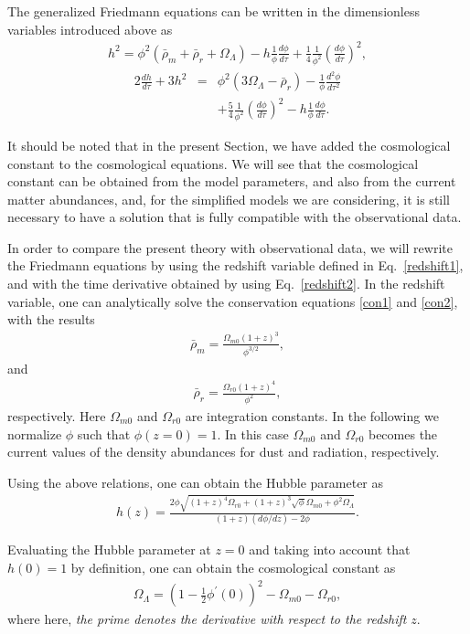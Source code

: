 \documentclass[aps,superscriptaddress, showpacs,preprintnumbers, superscriptaddress, nofootinbibt,twocolumn]{revtex4-2}
\def\bea{\begin{eqnarray}}
\def\eea{\end{eqnarray}}
\begin{document}
The generalized Friedmann  equations can be written in the dimensionless variables introduced above as
\begin{align}
h^2=\phi^2(\bar\rho_m+\bar\rho_r+\Omega_\Lambda)-h\frac{1}{\phi}\frac{d\phi}{d\tau}+\frac{1}{4}\frac{1}{\phi ^2}\left(\frac{d\phi}{d\tau}\right)^2,
\end{align}
\bea
2\frac{dh}{d\tau}+3h^2&=&\phi^2(3\Omega_\Lambda-\bar\rho_r)-\frac{1}{\phi}\frac{d^2\phi}{d\tau ^2}\nonumber\\
&&+\frac54\frac{1}{\phi ^2}\left(\frac{d\phi}{d\tau}\right)^2-h\frac{1}{\phi}\frac{d\phi}{d\tau}.
\eea

It should be noted that in the present Section, we have added the cosmological constant to the cosmological equations. We will see that the cosmological constant can be obtained from the model parameters, and also from the current matter abundances, and, for the simplified models we are considering, it is still necessary to have a solution that is fully compatible with the observational data.

In order to compare the present theory with observational data, we will rewrite the Friedmann equations by using the redshift variable defined in Eq.~\eqref{redshift1}, and with the time derivative obtained by using Eq.~\eqref{redshift2}. In the redshift variable, one can analytically solve the conservation equations \eqref{con1} and \eqref{con2}, with the results
\begin{align}
\bar\rho_m=\frac{\Omega_{m0}(1+z)^3}{\phi^{3/2}},
\end{align}
and
\begin{align}
\bar\rho_r=\frac{\Omega_{r0}(1+z)^4}{\phi^{2}},
\end{align}
respectively. Here $\Omega_{m0}$ and $\Omega_{r0}$ are integration constants. In the following we normalize $\phi$ such that  $\phi(z=0)=1$. In this case $\Omega_{m0}$ and $\Omega_{r0}$ becomes the current values of the density abundances for dust and radiation, respectively.

Using the above relations, one can obtain the Hubble parameter as
\begin{align}
h(z)=\frac{2\phi\sqrt{(1+z)^4\Omega_{r0}+(1+z)^3\sqrt{\phi}\Omega_{m0}+\phi^2\Omega_\Lambda}}{(1+z)\left(d\phi/dz\right)-2\phi}.
\end{align}

Evaluating the Hubble parameter at $z=0$ and taking into account that $h(0)=1$ by definition, one can obtain the cosmological constant as
\begin{align}
\Omega_\Lambda=\left(1-\frac12\phi^\prime(0)\right)^2-\Omega_{m0}-\Omega_{r0},
\end{align}
where here, {\it the prime denotes the derivative with respect to the redshift} $z$.
\end{document}
